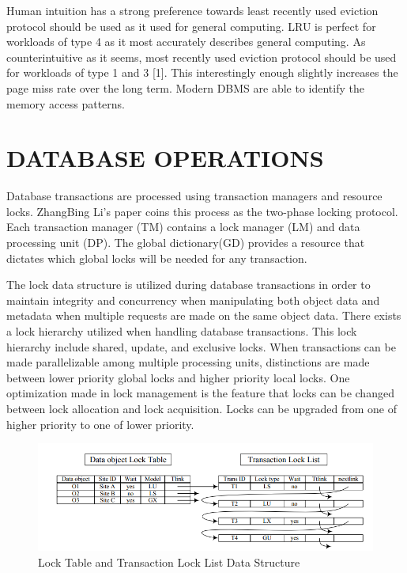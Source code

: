 \documentclass[letterpaper, 10 pt, conference]{ieeeconf}
\begin{document}
Human intuition has a strong preference towards least recently used eviction protocol should be used as it used for general computing.  LRU is perfect for workloads of type 4 as it most accurately describes general computing.  As counterintuitive as it seems, most recently used eviction protocol should be used for workloads of type 1 and 3 [1].  This interestingly enough slightly increases the page miss rate over the long term.  Modern DBMS are able to identify the memory access patterns.

\section{DATABASE OPERATIONS}
Database transactions are processed using transaction managers and resource locks.  ZhangBing Li’s paper coins this process as the two-phase locking protocol.  Each transaction manager (TM) contains a lock manager (LM) and data processing unit (DP).  The global dictionary(GD) provides a resource that dictates which global locks will be needed for any transaction.  

The lock data structure is utilized during database transactions in order to maintain integrity and concurrency when manipulating both object data and metadata when multiple requests are made on the same object data.  There exists a lock hierarchy utilized when handling database transactions.  This lock hierarchy include shared, update, and exclusive locks.  When transactions can be made parallelizable among multiple processing units, distinctions are made between lower priority global locks and higher priority local locks.  One optimization made in lock management is the feature that locks can be changed between lock allocation and lock acquisition.  Locks can be upgraded from one of higher priority to one of lower priority.  

\begin{figure}[h] %
	\centering
	\includegraphics [width=\textwidth] {Figures/Lock Table Transaction Lock List.png} 
    \caption{Lock Table and Transaction Lock List Data Structure \cite{8}}
\end{figure}
\end{document}
